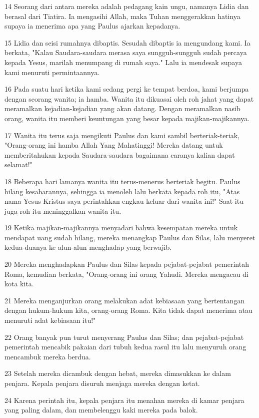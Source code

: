 \par 14 Seorang dari antara mereka adalah pedagang kain ungu, namanya Lidia dan berasal dari Tiatira. Ia mengasihi Allah, maka Tuhan menggerakkan hatinya supaya ia menerima apa yang Paulus ajarkan kepadanya.
\par 15 Lidia dan seisi rumahnya dibaptis. Sesudah dibaptis ia mengundang kami. Ia berkata, "Kalau Saudara-saudara merasa saya sungguh-sungguh sudah percaya kepada Yesus, marilah menumpang di rumah saya." Lalu ia mendesak supaya kami menuruti permintaannya.
\par 16 Pada suatu hari ketika kami sedang pergi ke tempat berdoa, kami berjumpa dengan seorang wanita; ia hamba. Wanita itu dikuasai oleh roh jahat yang dapat meramalkan kejadian-kejadian yang akan datang. Dengan meramalkan nasib orang, wanita itu memberi keuntungan yang besar kepada majikan-majikannya.
\par 17 Wanita itu terus saja mengikuti Paulus dan kami sambil berteriak-teriak, "Orang-orang ini hamba Allah Yang Mahatinggi! Mereka datang untuk memberitahukan kepada Saudara-saudara bagaimana caranya kalian dapat selamat!"
\par 18 Beberapa hari lamanya wanita itu terus-menerus berteriak begitu. Paulus hilang kesabarannya, sehingga ia menoleh lalu berkata kepada roh itu, "Atas nama Yesus Kristus saya perintahkan engkau keluar dari wanita ini!" Saat itu juga roh itu meninggalkan wanita itu.
\par 19 Ketika majikan-majikannya menyadari bahwa kesempatan mereka untuk mendapat uang sudah hilang, mereka menangkap Paulus dan Silas, lalu menyeret kedua-duanya ke alun-alun menghadap yang berwajib.
\par 20 Mereka menghadapkan Paulus dan Silas kepada pejabat-pejabat pemerintah Roma, kemudian berkata, "Orang-orang ini orang Yahudi. Mereka mengacau di kota kita.
\par 21 Mereka menganjurkan orang melakukan adat kebiasaan yang bertentangan dengan hukum-hukum kita, orang-orang Roma. Kita tidak dapat menerima atau menuruti adat kebiasaan itu!"
\par 22 Orang banyak pun turut menyerang Paulus dan Silas; dan pejabat-pejabat pemerintah mencabik pakaian dari tubuh kedua rasul itu lalu menyuruh orang mencambuk mereka berdua.
\par 23 Setelah mereka dicambuk dengan hebat, mereka dimasukkan ke dalam penjara. Kepala penjara disuruh menjaga mereka dengan ketat.
\par 24 Karena perintah itu, kepala penjara itu menahan mereka di kamar penjara yang paling dalam, dan membelenggu kaki mereka pada balok.
